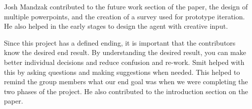 \documentclass[letterpaper]{article} %
\begin{document}
Josh Mandzak contributed to the future work section of the paper, the design of multiple powerpoints, and the creation of a survey used for prototype iteration. He also helped in the early stages to design the agent with creative input.

Since this project has a defined ending, it is important that the contributors know the desired end result. By understanding the desired result, you can make better individual decisions and reduce confusion and re-work. Smit helped with this by asking questions and making suggestions when needed. This helped to remind the group members what our end goal was when we were completing the two phases of the project. He also contributed to the introduction section on the paper.
\end{document}
